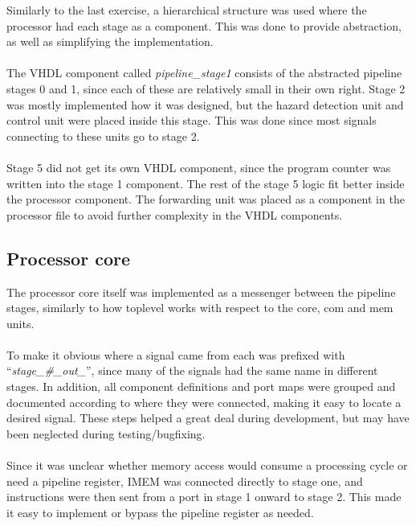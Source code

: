 Similarly to the last exercise, a hierarchical structure was used where the
processor had each stage as a component. This was done to provide abstraction,
as well as simplifying the implementation.
\paragraph*{}
The VHDL component called \emph{pipeline\_stage1} consists of the abstracted
pipeline stages 0 and 1, since each of these are relatively small in their own
right. Stage 2 was mostly implemented how it was designed, but the hazard
detection unit and control unit were placed inside this stage. This was done
since most signals connecting to these units go to stage 2.
\paragraph*{}
Stage 5 did not get its own VHDL component, since the program counter was
written into the stage 1 component. The rest of the stage 5 logic fit better
inside the processor component. The forwarding unit was placed as a component in the
processor file to avoid further complexity in the VHDL components.

\subsection{Processor core}
The processor core itself was implemented as a messenger between the pipeline
stages, similarly to how toplevel works with respect to the core, com and mem
units.
\paragraph*{}
To make it obvious where a signal came from each was prefixed with
``\emph{stage\_\#\_out\_}'', since many of the signals had the same name in
different stages. In addition, all component definitions and port maps were
grouped and documented according to where they were connected, making it easy to
locate a desired signal. These steps helped a great deal during development, but
may have been neglected during testing/bugfixing.
\paragraph*{}
Since it was unclear whether memory access would consume a processing cycle or
 need a pipeline register, IMEM was connected directly to stage one, and
 instructions were then sent from a port in stage 1 onward to stage 2. This made
 it easy to implement or bypass the pipeline register as needed.
